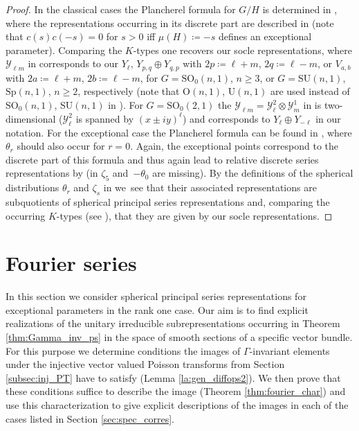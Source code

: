 \documentclass[JEP,XML,SOM,NoFloatCountersInSection,Unicode,published]{cedram}
\theoremstyle{definition}
\newcommand{\GSO}[1]{\ensuremath{\mathrm{SO}_0(#1,1)}}
\newcommand{\GSU}[1]{\ensuremath{\mathrm{SU}(#1,1)}}
\newcommand{\GSp}[1]{\ensuremath{\mathrm{Sp}(#1,1)}}
\begin{document}
\begin{proof}
In the classical cases the Plancherel formula for $G/H$ is determined in \cite[Th.\,10 ($q=1$)]{F79}, where the representations occurring in its discrete part are described in \cite[proof of Th.\,9.2]{F79} (note that $c(s)c(-s)=0$ for $s>0$ iff $\mu(H)\coloneqq -s$ defines an exceptional parameter). Comparing the $K$-types one recovers our socle representations, where $\mathscr{Y}_{\ell m}$ in \cite[p.\,399]{F79} corresponds to our $Y_\ell$, $Y_{p,q}\oplus Y_{q,p}$ with $2p\coloneqq\ell+m$, $2q\coloneqq\ell-m$, or $V_{a,b}$ with $2a\coloneqq\ell+m$, $2b\coloneqq\ell-m$, for $G=\GSO{n}$, $n\geq3$, or $G=\GSU{n}$, $\GSp{n}$, $n\geq 2$, respectively (note that $\mathrm{O}(n,1)$, $\mathrm{U}(n,1)$ are used instead of $\GSO{n}$, $\GSU{n}$ in \cite{F79}). For $G=\GSO{2}$ the $\mathscr{Y}_{\ell m}=\mathscr{Y}_\ell^2\otimes\mathscr{Y}_m^1$ in \cite{F79} is two-dimensional ($\mathscr{Y} _\ell^2$ is spanned by $(x\pm iy)^\ell$) and corresponds to $Y_\ell\oplus Y_{-\ell}$ in our notation. For the exceptional case the Plancherel formula can be found in \cite[p.\,85]{K83}, where $\theta_r$ should also occur for $r=0$. Again, the exceptional points correspond to the discrete part of this formula and thus again lead to relative discrete series representations by \cite[Th.\,3.12.1]{K83} (in \cite[Rem.\,3.13.4]{K83} $\zeta_5$ and~$-\theta_0$ are \hbox{missing}). By the definitions of the spherical distributions $\theta_r$ and $\zeta_s$ in \cite[pp.\,62,\,81]{K83} we~see that their associated representations are subquotients of spherical principal series representations and, comparing the occurring $K$-types (see \cite[Prop.\,3.9.4, pp.\,71,\,82]{K83}), that they are given by our socle representations.
\end{proof}

\section{Fourier series}\label{sec:Fourier}
In this section we consider spherical principal series representations for exceptional parameters in the rank one case. Our aim is to find explicit realizations of the unitary irreducible subrepresentations occurring in Theorem \ref{thm:Gamma_inv_ps} in the space of smooth sections of a specific vector bundle. For this purpose we determine conditions the images of $\Gamma$-invariant elements under the injective vector valued Poisson transforms from Section \ref{subsec:inj_PT} have to satisfy (Lemma \ref{la:gen_diffops2}). We then prove that these conditions suffice to describe the image (Theorem \ref{thm:fourier_char}) and use this characterization to give explicit descriptions of the images in each of the cases listed in Section \ref{sec:spec_corres}.
\end{document}
